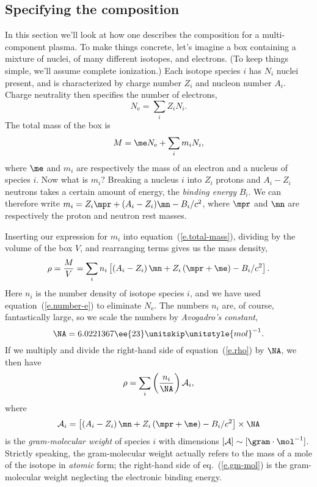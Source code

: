 \subsection{Specifying the composition}
In this section we'll look at how one describes the composition for a multi-component plasma.  To make things concrete, let's imagine a box containing a mixture of nuclei, of many different isotopes, and electrons.  (To keep things simple, we'll assume complete ionization.)  Each isotope species $i$ has $N_{i}$ nuclei present, and is characterized by charge number $Z_{i}$ and nucleon number $A_{i}$.  Charge neutrality then specifies the number of electrons,
\begin{equation}\label{e.number-e}
N_{\mathrm{e}} = \sum_{i} Z_{i} N_{i}.
\end{equation}
The total mass of the box is
\begin{equation}\label{e.total-mass}
M = \me N_{\mathrm{e}} + \sum_{i} m_{i}N_{i},
\end{equation}
where $\me$ and $m_{i}$ are respectively the mass of an electron and a nucleus of species $i$.  Now what is $m_{i}$? Breaking a nucleus $i$ into $Z_{i}$ protons and $A_{i}-Z_{i}$ neutrons takes a certain amount of energy, the \emph{binding energy} $B_{i}$.  We can therefore write $m_{i} = Z_{i}\mpr + (A_{i}-Z_{i})\mn - B_{i}/c^{2}$, where $\mpr$ and $\mn$ are respectively the proton and neutron rest masses.

Inserting our expression for $m_{i}$ into equation~(\ref{e.total-mass}), dividing by the volume of the box $V$, and rearranging terms gives us the mass density,
\begin{equation}\label{e.rho}
\rho = \frac{M}{V} = \sum_{i} n_{i}\left[ \left(A_{i}-Z_{i}\right) \mn + Z_{i}\left(\mpr + \me\right) - B_{i}/c^{2}\right].
\end{equation}
Here $n_{i}$ is the number density of isotope species $i$, and we have used equation~(\ref{e.number-e}) to eliminate $N_{\mathrm{e}}$.  The numbers $n_{i}$ are, of course, fantastically large, so we scale the numbers by \emph{Avogadro's constant},
\begin{equation}\label{e.avogadro-def}
\NA = 6.0221367\ee{23}\nsp\unitstyle{mol}^{-1}.
\end{equation}
If we multiply and divide the right-hand side of equation~(\ref{e.rho}) by $\NA$, we then have
\begin{equation}\label{e.molar-1}
\rho = \sum_{i} \left(\frac{n_{i}}{\NA}\right) \mathcal{A}_{i},
\end{equation}
where
\begin{equation}\label{e.gm-mol}
\mathcal{A}_{i} = \left[ \left(A_{i}-Z_{i}\right) \mn + Z_{i}\left(\mpr + \me\right) - B_{i}/c^{2}\right]\times\NA
\end{equation}
is the \emph{gram-molecular weight} of species $i$ with dimensions $[\mathcal{A}]\sim[\gram\cdot\mol^{-1}]$. Strictly speaking, the gram-molecular weight actually refers to the mass of a mole of the isotope in \emph{atomic} form; the right-hand side of eq.~(\ref{e.gm-mol}) is the gram-molecular weight neglecting the electronic binding energy.

